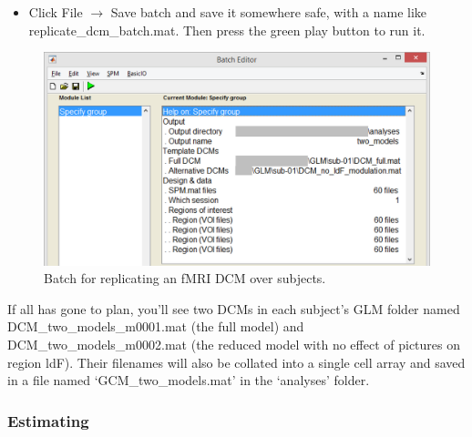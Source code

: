 \documentclass{article}
\begin{document}
\begin{itemize}
\begin{itemize}
\item Next we'll select the VOI files for the second region (ldF). Double click the second `Region (VOI files)' entry, navigate to the GLM folder by clicking .. on the left hand side, delete the contents of the filter box and type: VOI\_ldF. Then click Rec. This should find the ldF timeseries from all 60 subjects - press done. Then repeat this process for regions rvF then rdF. You should now have timeseries for all 4 regions of interest, and the batch should look like Figure \ref{Fig_batch_specify_group}.

\end{itemize}
\item Click File $\rightarrow$ Save batch and save it somewhere safe, with a name like replicate\_dcm\_batch.mat. Then press the green play button to run it.
\end{itemize}

\begin{figure}[ht]
\begin{center}
\includegraphics[width=\textwidth]{"Fig_batch_specify_group"}
\caption{Batch for replicating an fMRI DCM over subjects. \label{Fig_batch_specify_group}}
\end{center}
\end{figure}

If all has gone to plan, you'll see two DCMs in each subject's GLM folder named \\ DCM\_two\_models\_m0001.mat (the full model) and DCM\_two\_models\_m0002.mat (the reduced model with no effect of pictures on region ldF). Their filenames will also be collated into a single cell array and saved in a file named `GCM\_two\_models.mat' in the `analyses' folder.

\subsubsection{Estimating} \label{GUI_estimation}
\end{document}

